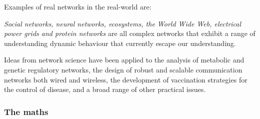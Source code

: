 \documentclass[a4paper,11pt,titlepage]{article}
\begin{document}
Examples of real networks in the real-world are:

\emph{Social networks, neural networks, ecosystems, the World Wide
  Web, electrical power grids and protein networks} are all complex
networks that exhibit a range of understanding dynamic behaviour that
currently escape our understanding. \cite{oconn11}

Ideas from network science have been applied to the analysis of
metabolic and genetic regulatory networks, the design of robust and
scalable communication networks both wired and wireless, the
development of vaccination strategies for the control of disease, and
a broad range of other practical issues. \cite{complexNets}

\subsubsection{The maths}

\end{document}
